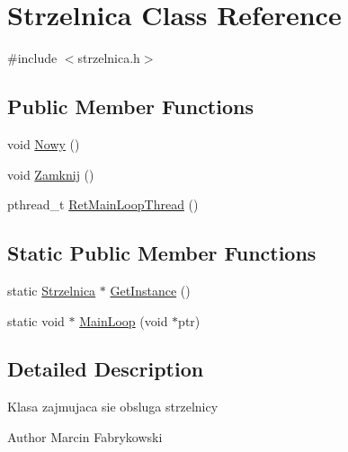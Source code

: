 \hypertarget{classStrzelnica}{
\section{Strzelnica Class Reference}
\label{classStrzelnica}
}


{\ttfamily \#include $<$strzelnica.h$>$}

\subsection*{Public Member Functions}
\begin{DoxyCompactItemize}
\item 
void \hyperlink{classStrzelnica_a302cebea01b16fab0af5d3f59cac9711}{Nowy} ()
\item 
void \hyperlink{classStrzelnica_ad79a2e13f258397bec5a1a4f9957950a}{Zamknij} ()
\item 
pthread\_\-t \hyperlink{classStrzelnica_a87418d047f58586ba4b597a976a0dd3f}{RetMainLoopThread} ()
\end{DoxyCompactItemize}
\subsection*{Static Public Member Functions}
\begin{DoxyCompactItemize}
\item 
static \hyperlink{classStrzelnica}{Strzelnica} $\ast$ \hyperlink{classStrzelnica_a29520cd8701e353e057114b9c00910ca}{GetInstance} ()
\item 
static void $\ast$ \hyperlink{classStrzelnica_a607aab055cd7b761fe5221d25f910c03}{MainLoop} (void $\ast$ptr)
\end{DoxyCompactItemize}


\subsection{Detailed Description}
Klasa zajmujaca sie obsluga strzelnicy \begin{DoxyAuthor}{Author}
Marcin Fabrykowski 
\end{DoxyAuthor}


